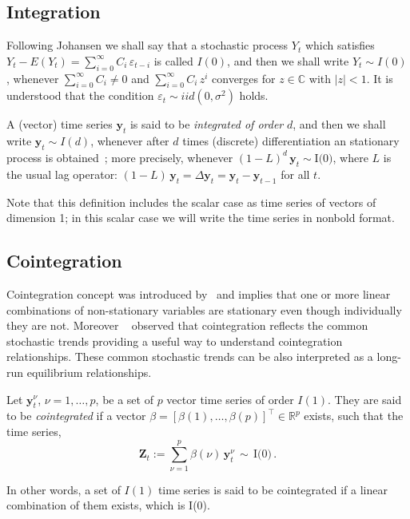\subsection{Integration}

Following Johansen \cite{johansen1995} we shall say that a stochastic process
$Y_t$ which satisfies $Y_t-E(Y_t) = \sum_{i=0}^\infty C_i\,\varepsilon_{t-i}$ is
called $I(0)$, and then we shall write $Y_t\sim I(0)$, whenever
$\sum_{i=0}^\infty C_i \neq 0$ and $\sum_{i=0}^\infty C_i\,z^i$ converges for
$z\in\mathbb{C}$ with $|z|<1$.  It is understood that the condition
$\varepsilon_t\sim iid(0,\sigma^2)$ holds.

A (vector) time series $\mathbf{y}_t$ is said to be {\em integrated of order\/}
$d$, and then we shall write $\mathbf{y}_t\sim I(d)$, whenever after $d$ times
(discrete) differentiation an stationary process is
obtained~\cite{banerjee1993};
more precisely, whenever
$(1-L)^d\,\mathbf{y}_t\sim\text{I(0)}$, where $L$ is the usual lag operator:
$(1-L)\,\mathbf{y}_t = \Delta\mathbf{y}_t = \mathbf{y}_t-\mathbf{y}_{t-1}$ for
all $t$.  

Note that this definition includes the scalar case as time series of
vectors of dimension 1; in this scalar case we will write the time series in
nonbold format.


\subsection{Cointegration}
Cointegration concept was introduced by~\cite{engle1987} and implies that one or
more linear combinations of non-stationary variables are stationary even though
individually they are not.  Moreover ~\cite{stock+watson1988} observed that
cointegration reflects the common stochastic trends providing a useful way to
understand cointegration relationships. These common stochastic trends can be
also interpreted as a long-run equilibrium relationships.

Let $\mathbf{y}_t^\nu$, $\nu=1,\dots,p$, be a set of $p$ vector time series of
order $I(1)$.  They are said to be {\em cointegrated\/} if a vector
$\beta=[\beta(1),\dots,\beta(p)]^\top \in \mathbb{R}^p$ exists, such that the
time series,
\begin{equation}
\mathbf{Z}_t:= 
\sum_{\nu=1}^p \beta(\nu)\,\mathbf{y}_t^\nu\,\sim\,\text{I(0)}\,.
\end{equation}

In other words, a set of $I(1)$ time series is said to be cointegrated if a
linear combination of them exists, which is I(0).

